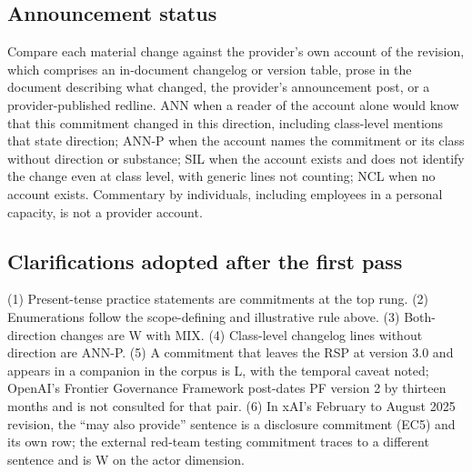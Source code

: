 \documentclass{article}
\begin{document}
\subsection{Announcement status}
Compare each material change against the provider's own account of the revision, which comprises an in-document changelog or version table, prose in the document describing what changed, the provider's announcement post, or a provider-published redline. ANN when a reader of the account alone would know that this commitment changed in this direction, including class-level mentions that state direction; ANN-P when the account names the commitment or its class without direction or substance; SIL when the account exists and does not identify the change even at class level, with generic lines not counting; NCL when no account exists. Commentary by individuals, including employees in a personal capacity, is not a provider account.
\subsection{Clarifications adopted after the first pass}
(1) Present-tense practice statements are commitments at the top rung. (2) Enumerations follow the scope-defining and illustrative rule above. (3) Both-direction changes are W with MIX. (4) Class-level changelog lines without direction are ANN-P. (5) A commitment that leaves the RSP at version 3.0 and appears in a companion in the corpus is L, with the temporal caveat noted; OpenAI's Frontier Governance Framework post-dates PF version 2 by thirteen months and is not consulted for that pair. (6) In xAI's February to August 2025 revision, the ``may also provide'' sentence is a disclosure commitment (EC5) and its own row; the external red-team testing commitment traces to a different sentence and is W on the actor dimension.
\end{document}
